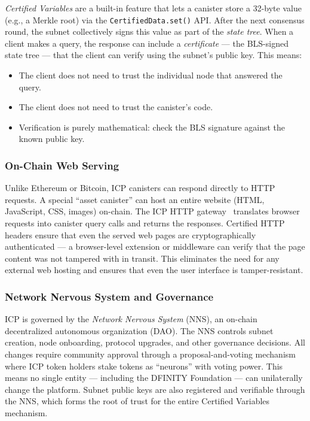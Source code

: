 \documentclass[conference]{IEEEtran}
\begin{document}
\emph{Certified Variables} are a built-in feature that lets a canister store a 32-byte value (e.g., a Merkle root) via the \texttt{CertifiedData.set()} API. After the next consensus round, the subnet collectively signs this value as part of the \emph{state tree}. When a client makes a query, the response can include a \emph{certificate} — the BLS-signed state tree — that the client can verify using the subnet's public key. This means:
\begin{itemize}[leftmargin=*]
  \item The client does not need to trust the individual node that answered the query.
  \item The client does not need to trust the canister's code.
  \item Verification is purely mathematical: check the BLS signature against the known public key.
\end{itemize}

\subsubsection{On-Chain Web Serving}
Unlike Ethereum or Bitcoin, ICP canisters can respond directly to HTTP requests. A special ``asset canister'' can host an entire website (HTML, JavaScript, CSS, images) on-chain. The ICP HTTP gateway~\cite{dfinity2023httpgateway} translates browser requests into canister query calls and returns the responses. Certified HTTP headers ensure that even the served web pages are cryptographically authenticated — a browser-level extension or middleware can verify that the page content was not tampered with in transit. This eliminates the need for any external web hosting and ensures that even the user interface is tamper-resistant.

\subsubsection{Network Nervous System and Governance}
ICP is governed by the \emph{Network Nervous System} (NNS), an on-chain decentralized autonomous organization (DAO). The NNS controls subnet creation, node onboarding, protocol upgrades, and other governance decisions. All changes require community approval through a proposal-and-voting mechanism where ICP token holders stake tokens as ``neurons'' with voting power. This means no single entity — including the DFINITY Foundation — can unilaterally change the platform. Subnet public keys are also registered and verifiable through the NNS, which forms the root of trust for the entire Certified Variables mechanism.
\end{document}
